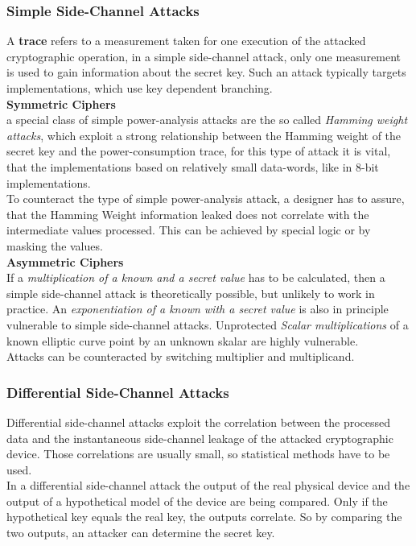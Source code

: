 \documentclass[a4paper, 10 pt, conference]{ieeeconf}
\begin{document}
\subsubsection{\textbf{Simple Side-Channel Attacks}}
A \textbf{trace} refers to a measurement taken for one execution of the attacked cryptographic operation, in a simple side-channel attack, only one measurement is used to gain information about the secret key. Such an attack typically targets implementations, which use key dependent branching. \\
\textbf{Symmetric Ciphers}\\
a special class of simple power-analysis attacks are the so called \emph{Hamming weight attacks}, which exploit a strong relationship between the Hamming weight of the secret key and the power-consumption trace, for this type of attack it is vital, that the implementations based on relatively small data-words, like in 8-bit implementations. \\
To counteract the type of simple power-analysis attack, a designer has to assure, that the Hamming Weight information leaked does not correlate with the intermediate values processed. This can be achieved by special logic or by masking the values. \\
\textbf{Asymmetric Ciphers} \\ 
If a \emph{multiplication of a known and a secret value} has to be calculated, then a simple side-channel attack is theoretically possible, but unlikely to work in practice. An \emph{exponentiation of a known with a secret value} is also in principle vulnerable to simple side-channel attacks. Unprotected \emph{Scalar multiplications} of a known elliptic curve point by an unknown skalar are highly vulnerable. \\
Attacks can be counteracted by switching multiplier and multiplicand.

\vspace{0.5cm}
\subsubsection{\textbf{Differential Side-Channel Attacks}}
Differential side-channel attacks exploit the correlation between the processed data and the instantaneous side-channel leakage of the attacked cryptographic device. Those correlations are usually small, so statistical methods have to be used. \\
In a differential side-channel attack the output of the real physical device and the output of a hypothetical model of the device are being compared. Only if the hypothetical key equals the real key, the outputs correlate. 
So by comparing the two outputs, an attacker can determine the secret key. 
\end{document}
